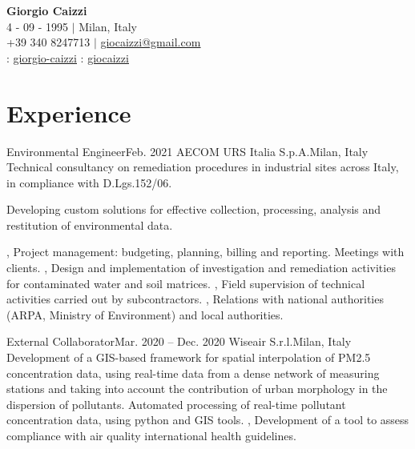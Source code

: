 \documentclass[letterpaper,11pt]{article}
\begin{document}
\begin{center}
  \textbf{\Huge \bfseries Giorgio Caizzi} \\
  \vspace{3pt} 4 - 09 - 1995 $|$ Milan, Italy \\
  \small +39 340 8247713 $|$ \href{mailto:giocaizzi@gmail.com}{\underline{giocaizzi@gmail.com}}\\
  \vspace{3pt}
  \faLinkedinSquare{} : \href{https://linkedin.com/in/giorgio-caizzi/}{\underline{giorgio-caizzi}}
  \faGithubSquare{} : \href{https://www.github.com/giocaizzi/}{\underline{giocaizzi}}\\
\end{center}
\vspace{-30pt}

\section{Experience}
\sectionElementListStart

\sectionElement
{Environmental Engineer}{Feb. 2021}
{AECOM URS Italia S.p.A.}{Milan, Italy}
{
  Technical consultancy on remediation procedures in industrial sites across Italy, in compliance with D.Lgs.152/06.
}
{
  {
      Developing custom solutions for effective collection, processing, analysis and restitution of environmental data.

    },
  {
      Project management: budgeting, planning, billing and reporting. Meetings with clients.
    },
  {
      Design and implementation of investigation and remediation activities for contaminated water and soil matrices.
    },
  {
    Field supervision of technical activities carried out by subcontractors.
    },
  {
      Relations with national authorities (ARPA, Ministry of Environment) and local authorities.
    }
}


\sectionElement
{External Collaborator}{Mar. 2020 -- Dec. 2020}
{Wiseair S.r.l.}{Milan, Italy}
{
  Development of a GIS-based framework for spatial interpolation of PM2.5 concentration
  data, using real-time data from a dense network of measuring stations and taking into account the contribution of
  urban morphology in the dispersion of pollutants.
}
{
  {
      Automated processing of real-time pollutant concentration data, using python and GIS tools.
    },
  {
      Development of a tool to assess compliance with air quality international health guidelines.
    }
}
\end{document}
